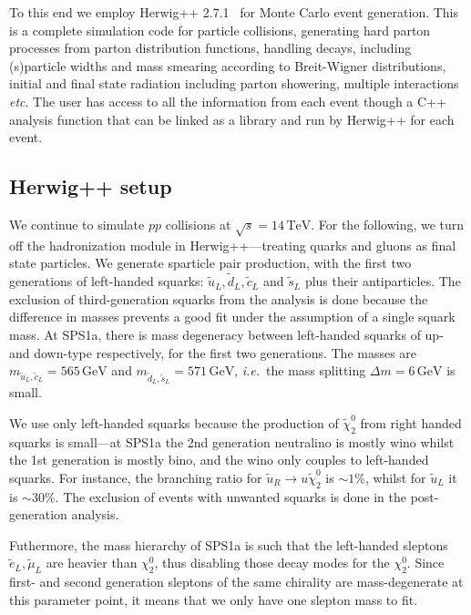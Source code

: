 \documentclass[twoside,english]{uiofysmaster}
\begin{document}
To this end we employ {\ttfamily Herwig++  2.7.1}~\cite{Bahr:2008pv} for Monte Carlo event generation. This is a complete simulation code for particle collisions, generating hard parton processes from parton distribution functions, handling decays, including (s)particle widths and mass smearing according to Breit-Wigner distributions, initial and final state radiation including parton showering, multiple interactions {\it etc}. The user has access to all the information from each event though a {\ttfamily C++} analysis function that can be linked as a library and run by {\ttfamily Herwig++} for each event.

\subsection{{\ttfamily Herwig++} setup}

We continue to simulate $pp$ collisions at $\sqrt{s}=14 \, \mathrm{TeV}$. For the following, we turn off the hadronization module in {\ttfamily Herwig++}---treating quarks and gluons as final state particles. 
We generate sparticle pair production, with the first two generations of left-handed squarks: $\tilde{u}_L,\tilde{d}_L,\tilde{c}_L$ and $\tilde{s}_L$ plus their antiparticles. The exclusion of third-generation squarks from the analysis is done because the difference in masses prevents a good fit under the assumption of a single squark mass. At SPS1a, there is mass degeneracy between left-handed squarks of up- and down-type respectively, for the first two generations. The masses are $m_{\tilde u_L, \tilde c_L} = 565 \,\mathrm{GeV}$ and $m_{\tilde d_L, \tilde s_L} = 571 \, \mathrm{GeV}$, {\it i.e.}\ the mass splitting $\Delta m = 6 \, \mathrm{GeV}$ is small. 

We use only left-handed squarks because the production of $\tilde \chi_2^0$ from right handed squarks is small---at SPS1a the 2nd generation neutralino is mostly wino whilst the 1st generation is mostly bino, and the wino only couples to left-handed squarks. For instance, the branching ratio for $\tilde u_R \to u \tilde \chi_2^0$ is $\sim 1 \%$, whilst for $\tilde u_L$ it is $\sim 30 \%$. The exclusion of events with unwanted squarks is done in the post-generation analysis.

Futhermore, the mass hierarchy of SPS1a is such that the left-handed sleptons $\tilde e_L, \tilde \mu_L$ are heavier than $\chi_2^0$, thus disabling those decay modes for the $\chi_2^0$. Since first- and second generation sleptons of the same chirality are mass-degenerate at this parameter point, it means that we only have one slepton mass to fit.
\end{document}
